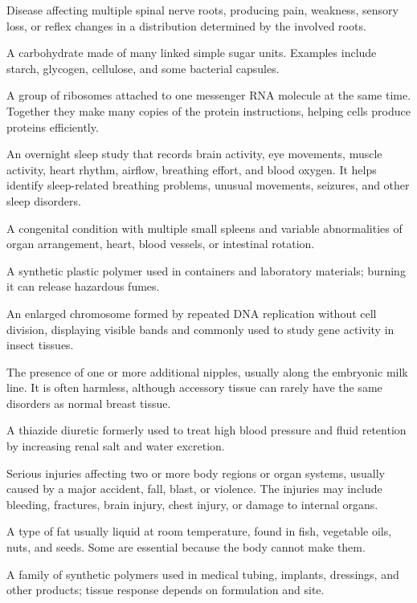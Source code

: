  Disease affecting multiple spinal nerve roots, producing pain, weakness, sensory loss, or reflex changes in a distribution determined by the involved roots.

 A carbohydrate made of many linked simple sugar units. Examples include starch, glycogen, cellulose, and some bacterial capsules.

 A group of ribosomes attached to one messenger RNA molecule at the same time. Together they make many copies of the protein instructions, helping cells produce proteins efficiently.

 An overnight sleep study that records brain activity, eye movements, muscle activity, heart rhythm, airflow, breathing effort, and blood oxygen. It helps identify sleep-related breathing problems, unusual movements, seizures, and other sleep disorders.

 A congenital condition with multiple small spleens and variable abnormalities of organ arrangement, heart, blood vessels, or intestinal rotation.

 A synthetic plastic polymer used in containers and laboratory materials; burning it can release hazardous fumes.

 An enlarged chromosome formed by repeated DNA replication without cell division, displaying visible bands and commonly used to study gene activity in insect tissues.

 The presence of one or more additional nipples, usually along the embryonic milk line. It is often harmless, although accessory tissue can rarely have the same disorders as normal breast tissue.

 A thiazide diuretic formerly used to treat high blood pressure and fluid retention by increasing renal salt and water excretion.

 Serious injuries affecting two or more body regions or organ systems, usually caused by a major accident, fall, blast, or violence. The injuries may include bleeding, fractures, brain injury, chest injury, or damage to internal organs.

 A type of fat usually liquid at room temperature, found in fish, vegetable oils, nuts, and seeds. Some are essential because the body cannot make them.

 A family of synthetic polymers used in medical tubing, implants, dressings, and other products; tissue response depends on formulation and site.


